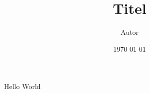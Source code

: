 \documentclass[a4paper, 10pt, fleqn]{article}
\title{Titel}
\author{Autor}
\date{\today}
\begin{document}
\maketitle
Hello World
\end{document}
